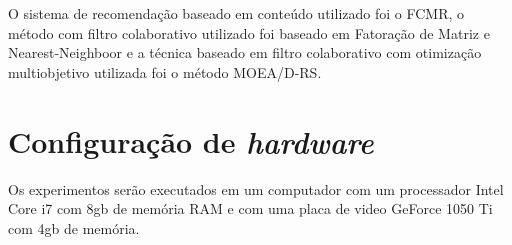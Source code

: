 O sistema de recomendação baseado em conteúdo utilizado foi o FCMR, o método com filtro colaborativo utilizado foi baseado em Fatoração de Matriz e Nearest-Neighboor e a técnica baseado em filtro colaborativo com otimização multiobjetivo utilizada foi o método MOEA/D-RS.

\section{Configuração de \textit{hardware}}
Os experimentos serão executados em um computador com um processador Intel Core i7 com 8gb de memória RAM e com uma placa de video GeForce 1050 Ti com 4gb de memória. 